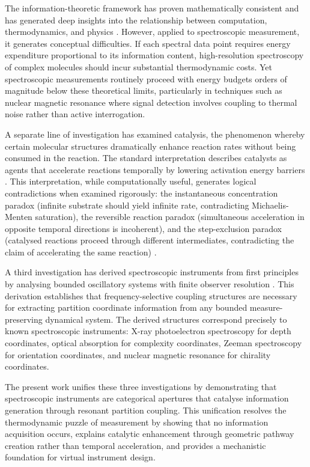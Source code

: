 \documentclass[twocolumn,10pt,a4paper]{article}
\theoremstyle{definition}
\theoremstyle{remark}
\begin{document}
The information-theoretic framework has proven mathematically consistent and has generated deep insights into the relationship between computation, thermodynamics, and physics \citep{bennett2003}. However, applied to spectroscopic measurement, it generates conceptual difficulties. If each spectral data point requires energy expenditure proportional to its information content, high-resolution spectroscopy of complex molecules should incur substantial thermodynamic costs. Yet spectroscopic measurements routinely proceed with energy budgets orders of magnitude below these theoretical limits, particularly in techniques such as nuclear magnetic resonance where signal detection involves coupling to thermal noise rather than active interrogation.

A separate line of investigation has examined catalysis, the phenomenon whereby certain molecular structures dramatically enhance reaction rates without being consumed in the reaction. The standard interpretation describes catalysts as agents that accelerate reactions temporally by lowering activation energy barriers \citep{eyring1935}. This interpretation, while computationally useful, generates logical contradictions when examined rigorously: the instantaneous concentration paradox (infinite substrate should yield infinite rate, contradicting Michaelis-Menten saturation), the reversible reaction paradox (simultaneous acceleration in opposite temporal directions is incoherent), and the step-exclusion paradox (catalysed reactions proceed through different intermediates, contradicting the claim of accelerating the same reaction) \citep{sachikonye2024catalysis}.

A third investigation has derived spectroscopic instruments from first principles by analysing bounded oscillatory systems with finite observer resolution \citep{sachikonye2024instruments}. This derivation establishes that frequency-selective coupling structures are necessary for extracting partition coordinate information from any bounded measure-preserving dynamical system. The derived structures correspond precisely to known spectroscopic instruments: X-ray photoelectron spectroscopy for depth coordinates, optical absorption for complexity coordinates, Zeeman spectroscopy for orientation coordinates, and nuclear magnetic resonance for chirality coordinates.

The present work unifies these three investigations by demonstrating that spectroscopic instruments are categorical apertures that catalyse information generation through resonant partition coupling. This unification resolves the thermodynamic puzzle of measurement by showing that no information acquisition occurs, explains catalytic enhancement through geometric pathway creation rather than temporal acceleration, and provides a mechanistic foundation for virtual instrument design.
\end{document}
